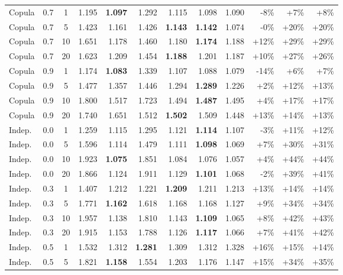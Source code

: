 \begin{table}[t]
\begin{tabular}{lcc | rrrrrr | rrr}
    Copula & 0.7 & 1 & 1.195 & \textbf{1.097} & 1.292 & 1.115 & 1.098 & 1.090 & -8\% & +7\% & +8\% \\
    Copula & 0.7 & 5 & 1.423 & 1.161 & 1.426 & \textbf{1.143} & \textbf{1.142} & 1.074 & -0\% & +20\% & +20\% \\
    Copula & 0.7 & 10 & 1.651 & 1.178 & 1.460 & 1.180 & \textbf{1.174} & 1.188 & +12\% & +29\% & +29\% \\
    Copula & 0.7 & 20 & 1.623 & 1.209 & 1.454 & \textbf{1.188} & 1.201 & 1.187 & +10\% & +27\% & +26\% \\
    Copula & 0.9 & 1 & 1.174 & \textbf{1.083} & 1.339 & 1.107 & 1.088 & 1.079 & -14\% & +6\% & +7\% \\
    Copula & 0.9 & 5 & 1.477 & 1.357 & 1.446 & 1.294 & \textbf{1.289} & 1.226 & +2\% & +12\% & +13\% \\
    Copula & 0.9 & 10 & 1.800 & 1.517 & 1.723 & 1.494 & \textbf{1.487} & 1.495 & +4\% & +17\% & +17\% \\
    Copula & 0.9 & 20 & 1.740 & 1.651 & 1.512 & \textbf{1.502} & 1.509 & 1.448 & +13\% & +14\% & +13\% \\
    Indep. & 0.0 & 1 & 1.259 & 1.115 & 1.295 & 1.121 & \textbf{1.114} & 1.107 & -3\% & +11\% & +12\% \\
    Indep. & 0.0 & 5 & 1.596 & 1.114 & 1.479 & 1.111 & \textbf{1.098} & 1.069 & +7\% & +30\% & +31\% \\
    Indep. & 0.0 & 10 & 1.923 & \textbf{1.075} & 1.851 & 1.084 & 1.076 & 1.057 & +4\% & +44\% & +44\% \\
    Indep. & 0.0 & 20 & 1.866 & 1.124 & 1.911 & 1.129 & \textbf{1.101} & 1.068 & -2\% & +39\% & +41\% \\
    Indep. & 0.3 & 1 & 1.407 & 1.212 & 1.221 & \textbf{1.209} & 1.211 & 1.213 & +13\% & +14\% & +14\% \\
    Indep. & 0.3 & 5 & 1.771 & \textbf{1.162} & 1.618 & 1.168 & 1.168 & 1.127 & +9\% & +34\% & +34\% \\
    Indep. & 0.3 & 10 & 1.957 & 1.138 & 1.810 & 1.143 & \textbf{1.109} & 1.065 & +8\% & +42\% & +43\% \\
    Indep. & 0.3 & 20 & 1.915 & 1.153 & 1.788 & 1.126 & \textbf{1.117} & 1.066 & +7\% & +41\% & +42\% \\
    Indep. & 0.5 & 1 & 1.532 & 1.312 & \textbf{1.281} & 1.309 & 1.312 & 1.328 & +16\% & +15\% & +14\% \\
    Indep. & 0.5 & 5 & 1.821 & \textbf{1.158} & 1.554 & 1.203 & 1.176 & 1.147 & +15\% & +34\% & +35\% \\

\end{tabular}
\end{table}
